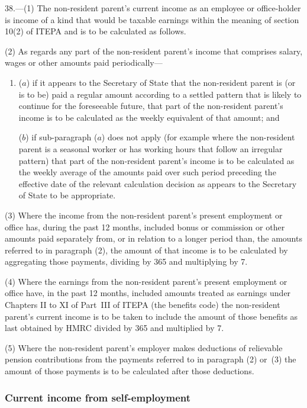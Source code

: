 \documentclass[12pt,a4paper]{article}
\begin{document}
38.---(1)  The non-resident parent’s current income as an employee or office-holder is income of a kind that would be taxable earnings within the meaning of section 10(2) of ITEPA and is to be calculated as follows.

(2) As regards any part of the non-resident parent’s income that comprises salary, wages or other amounts paid periodically—
\begin{enumerate}\item[]
($a$) if it appears to the Secretary of State that the non-resident parent is (or is to be) paid a regular amount according to a settled pattern that is likely to continue for the foreseeable future, that part of the non-resident parent’s income is to be calculated as the weekly equivalent of that amount; and

($b$) if sub-paragraph ($a$)  does not apply (for example where the non-resident parent is a seasonal worker or has working hours that follow an irregular pattern) that part of the non-resident parent’s income is to be calculated as the weekly average of the amounts paid over such period preceding the effective date of the relevant calculation decision as appears to the Secretary of State to be appropriate.
\end{enumerate}

(3) Where the income from the non-resident parent’s present employment or office has, during the past 12 months, included bonus or commission or other amounts paid separately from, or in relation to a longer period than, the amounts referred to in paragraph (2), the amount of that income is to be calculated by aggregating those payments, dividing by 365 and multiplying by 7.

(4) Where the earnings from the non-resident parent’s present employment or office have, in the past 12 months, included amounts treated as earnings under Chapters II to XI of Part~III of ITEPA (the benefits code) the non-resident parent’s current income is to be taken to include the amount of those benefits as last obtained by HMRC divided by 365 and multiplied by 7.

(5) Where the non-resident parent’s employer makes deductions of relievable pension contributions from the payments referred to in paragraph (2) or~(3) the amount of those payments is to be calculated after those deductions.

\subsubsection[39. Current income from self-employment]{Current income from self-employment}
\end{document}
